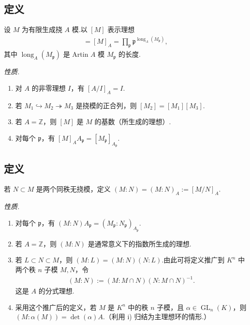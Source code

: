 \subsection{定义}\label{sec:nt-3-3-7}
\begin{definition*}
设 $M$ 为有限生成挠 $A$ 模.以 $[M]$ 表示理想
\begin{align*}
[M]=[M]_A=\prod_{\mathfrak p}\mathfrak p^{\operatorname{long}_A(M_{\mathfrak p})},
\end{align*}
其中 $\operatorname{long}_A(M_{\mathfrak p})$ 是 Artin $A$ 模 $M_{\mathfrak p}$ 的长度.
\end{definition*}
\emph{性质.}
\begin{enumerate}[label=\roman*)]
\item 对 $A$ 的非零理想 $I$，有 $[A/I]_A=I$.
\item 若 $M_1\hookrightarrow M_2\twoheadrightarrow M_3$ 是挠模的正合列，则 $[M_2]=[M_1][M_3]$.
\item 若 $A=\mathbb Z$，则 $[M]$ 是 $M$ 的基数（所生成的理想）.
\item 对每个 $\mathfrak p$，有 $[M]_AA_{\mathfrak p}=[M_{\mathfrak p}]_{A_{\mathfrak p}}$.
\end{enumerate}
\subsection{定义}\label{sec:nt-3-3-8}
\begin{definition*}
若 $N\subset M$ 是两个同秩无挠模，定义 $(M:N)=(M:N)_A:=[M/N]_A$.
\end{definition*}
\emph{性质.}
\begin{enumerate}[label=\roman*)]
\item 对每个 $\mathfrak p$，有 $(M:N)A_{\mathfrak p}=(M_{\mathfrak p}:N_{\mathfrak p})_{A_{\mathfrak p}}$.
\item 若 $A=\mathbb Z$，则 $(M:N)$ 是通常意义下的指数所生成的理想.
\item 若 $L\subset N\subset M$，则 $(M:L)=(M:N)(N:L)$.由此可将定义推广到 $K^n$ 中两个秩 $n$ 子模 $M,N$，令
\begin{align*}
(M:N):=(M:M\cap N)(N:M\cap N)^{-1}.
\end{align*}
这是 $A$ 的分式理想.
\item 采用这个推广后的定义，若 $M$ 是 $K^n$ 中的秩 $n$ 子模，且 $\alpha\in\operatorname{GL}_n(K)$，则 $(M:\alpha(M))=\det(\alpha)A$.（利用 i) 归结为主理想环的情形.）
\end{enumerate}

